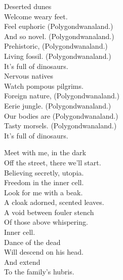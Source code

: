 



Deserted dunes \\
Welcome weary feet. \\
Feel euphoric (Polygondwanaland.) \\
And so novel. (Polygondwanaland.) \\
Prehistoric, (Polygondwanaland.) \\
Living fossil. (Polygondwanaland.) \\

It's full of dinosaurs. \\

Nervous natives \\
Watch pompous pilgrims. \\
Foreign nature, (Polygondwanaland.) \\
Eerie jungle. (Polygondwanaland.) \\
Our bodies are (Polygondwanaland.) \\
Tasty morsels. (Polygondwanaland.) \\

It's full of dinosaurs. \\





Meet with me, in the dark \\
Off the street, there we'll start. \\
Believing secretly, utopia. \\
Freedom in the inner cell. \\

Look for me with a beak. \\
A cloak adorned, scented leaves. \\
A void between fouler stench \\
Of those above whispering. \\
Inner cell. \\

Dance of the dead \\
Will descend on his head. \\
And extend \\
To the family's hubris. \\


